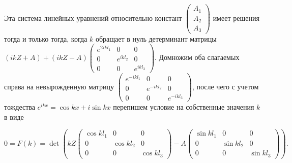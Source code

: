 Эта система линейных уравнений относительно констант $\begin{pmatrix}
 A_1 \\  A_2 \\  A_3
\end{pmatrix}$ имеет решения тогда и только тогда, когда $k$ обращает в нуль детерминант матрицы $\left(
i k Z + A 
\right)
 + 
(i k Z - A )
\begin{pmatrix}
e^{ 2i  k l_1} 	& 0 			& 0 \\ 
0 		& e^{ i  k l_2}  	& 0 \\ 
0		& 0			& e^{ i  k l_3}
\end{pmatrix}.
$
Домножим оба слагаемых справа на невырожденную матрицу $\begin{pmatrix}
e^{ -i  k l_1} 	& 0 			& 0 \\ 
0 		& e^{ -i  k l_2}  	& 0 \\ 
0		& 0			& e^{ -i  k l_3}
\end{pmatrix}$, после чего с учетом тождества $e^{i  k x} = \cos k x + i \sin k x$ перепишем условие на собственные значения $k$ в виде

\begin{equation}
0=F(k)=\det  \left(
k Z 
\begin{pmatrix}
\cos k l_1 	& 0 			& 0 \\ 
0 		& \cos k l_2  	& 0 \\ 
0		& 0			& \cos k l_3
\end{pmatrix}
 - A \begin{pmatrix}
\sin k l_1 	& 0 			& 0 \\ 
0 		& \sin k l_2  	& 0 \\ 
0		& 0			& \sin k l_3
\end{pmatrix} \right).
 \label{eq:ch4:eigenF}
 \end{equation}



